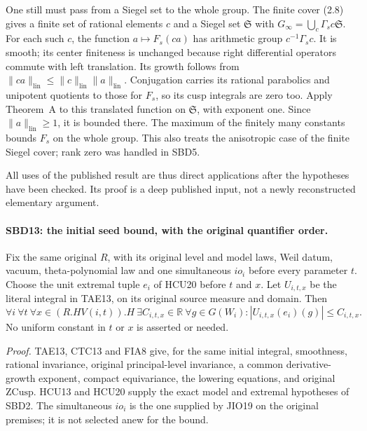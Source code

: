 \documentclass[11pt,a4paper]{article}
\numberwithin{equation}{section}
\theoremstyle{remark}\newtheorem{remark}[theorem]{Remark}
\begin{document}
One still must pass from a Siegel set to the whole group.
The finite cover (2.8) gives a finite set of rational elements
\(c\) and a Siegel set \(\mathfrak S\) with
\(G_\infty=\bigcup_c\Gamma_s c\mathfrak S\).
For each such \(c\), the function \(a\mapsto F_s(ca)\)
has arithmetic group \(c^{-1}\Gamma_s c\).  It is smooth;
its center finiteness is unchanged because right differential
operators commute with left translation.  Its growth follows
from \(\|ca\|_{\mathrm{lin}}\le
\|c\|_{\mathrm{lin}}\|a\|_{\mathrm{lin}}\).
Conjugation carries its rational parabolics and unipotent
quotients to those for \(F_s\), so its cusp integrals are
zero too.  Apply Theorem~A to this translated function on
\(\mathfrak S\), with exponent one.  Since
\(\|a\|_{\mathrm{lin}}\ge1\), it is bounded there.
The maximum of the finitely many constants bounds \(F_s\)
on the whole group.  This also treats the anisotropic case
of the finite Siegel cover; rank zero was handled in SBD5.

All uses of the published result are thus direct applications
after the hypotheses have been checked.  Its proof is a deep
published input, not a newly reconstructed elementary argument.

\paragraph{SBD13: the initial seed bound, with the original quantifier order.}
\label{claim:SBD13}
Fix the same original \(R\), with its original level and model
laws, Weil datum, vacuum, theta-polynomial law and one
simultaneous \(io_i\) before every parameter \(t\).
Choose the unit extremal tuple \(e_i\) of HCU20 before \(t\)
and \(x\).  Let \(U_{i,t,x}\) be the literal integral in
TAE13, on its original source measure and domain.  Then
\[
 \forall i\ \forall t\ \forall x\in(R.HV(i,t)).H\
 \exists C_{i,t,x}\in\mathbb R\ \forall g\in G(W_i):
       |U_{i,t,x}(e_i)(g)|\le C_{i,t,x}.
 \tag{SBD.22}
\]
No uniform constant in \(t\) or \(x\) is asserted or needed.

\emph{Proof.}
TAE13, CTC13 and FIA8 give, for the same initial integral,
smoothness, rational invariance, original principal-level
invariance, a common derivative-growth exponent, compact
equivariance, the lowering equations, and original
\(\mathrm{ZCusp}\).  HCU13 and HCU20 supply the exact model
and extremal hypotheses of SBD2.  The simultaneous \(io_i\)
is the one supplied by JIO19 on the original premises; it is
not selected anew for the bound.
\end{document}
